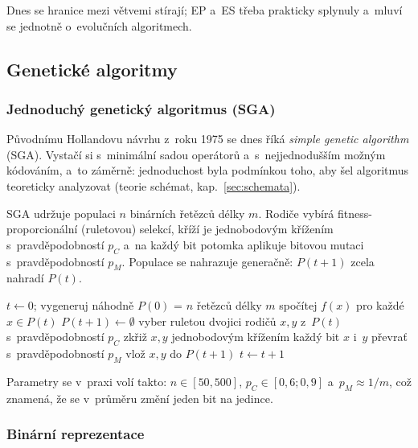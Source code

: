 \documentclass[11pt,a4paper]{article}
\theoremstyle{definition}
\begin{document}
Dnes se hranice mezi větvemi stírají; EP a~ES třeba prakticky splynuly a~mluví se jednotně
o~evolučních algoritmech.

\subsection{Genetické algoritmy}
\label{ssec:sga}

\subsubsection{Jednoduchý genetický algoritmus (SGA)}

Původnímu Hollandovu návrhu z~roku 1975 se dnes říká \emph{simple genetic algorithm} (SGA).
Vystačí si s~minimální sadou operátorů a~s~nejjednodušším možným kódováním, a~to záměrně:
jednoduchost byla podmínkou toho, aby šel algoritmus teoreticky analyzovat (teorie schémat,
kap.~\ref{sec:schemata}).

\begin{defbox}[SGA]
SGA udržuje populaci $n$ binárních řetězců délky $m$. Rodiče vybírá
fitness-proporcionální (ruletovou) selekcí, kříží je jednobodovým křížením
s~pravděpodobností $p_C$ a~na každý bit potomka aplikuje bitovou mutaci
s~pravděpodobností $p_M$. Populace se nahrazuje generačně: $P(t+1)$ zcela
nahradí $P(t)$.
\end{defbox}

\begin{algorithm}[!ht]
\caption{Jednoduchý genetický algoritmus (SGA)}
\begin{algorithmic}[1]
\State $t \gets 0$; vygeneruj náhodně $P(0)$ = $n$ řetězců délky $m$
  \State spočítej $f(x)$ pro každé $x \in P(t)$
  \State $P(t+1) \gets \emptyset$
    \State vyber ruletou dvojici rodičů $x, y$ z~$P(t)$
    \State s~pravděpodobností $p_C$ zkřiž $x, y$ jednobodovým křížením
    \State každý bit $x$ i~$y$ převrať s~pravděpodobností $p_M$
    \State vlož $x, y$ do $P(t+1)$
  \EndFor
  \State $t \gets t+1$
\EndWhile
\end{algorithmic}
\end{algorithm}

Parametry se v~praxi volí takto: $n \in [50, 500]$, $p_C \in [0{,}6; 0{,}9]$
a~$p_M \approx 1/m$, což znamená, že se v~průměru změní jeden bit na jedince.

\subsubsection{Binární reprezentace}
\end{document}
